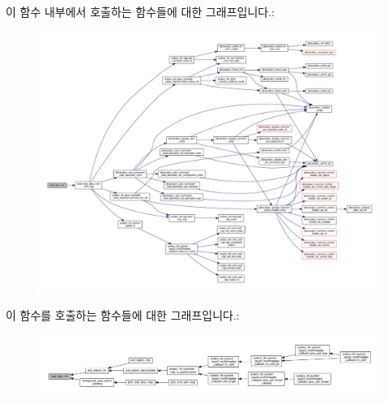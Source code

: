 이 함수 내부에서 호출하는 함수들에 대한 그래프입니다.\+:
\nopagebreak
\begin{figure}[H]
\begin{center}
\leavevmode
\includegraphics[width=350pt]{classavdecc__lib_1_1end__station__imp_a6f1d8190a18143551c01f029cc554a50_cgraph}
\end{center}
\end{figure}




이 함수를 호출하는 함수들에 대한 그래프입니다.\+:
\nopagebreak
\begin{figure}[H]
\begin{center}
\leavevmode
\includegraphics[width=350pt]{classavdecc__lib_1_1end__station__imp_a6f1d8190a18143551c01f029cc554a50_icgraph}
\end{center}
\end{figure}


